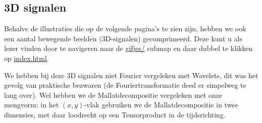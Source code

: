 \subsection{3D signalen}
Behalve de illustraties die op de volgende pagina's te zien zijn, hebben we ook een aantal bewegende beelden (3D-signalen) gecomprimeerd. Deze kunt u als lezer vinden door te navigeren naar de \url{gifjes/} submap en daar dubbel te klikken op \url{index.html}.

We hebben bij deze 3D signalen niet Fourier vergeleken met Wavelets, dit was het gevolg van praktische bezwaren 
(de Fouriertransformatie deed er simpelweg te lang over). 
Wel hebben we de Mallatdecompositie vergeleken met onze mengvorm: 
in het $(x,y)$-vlak gebruiken we de Mallatdecompositie in twee dimensies, 
met daar loodrecht op een Tensorproduct in de tijdsrichting.

